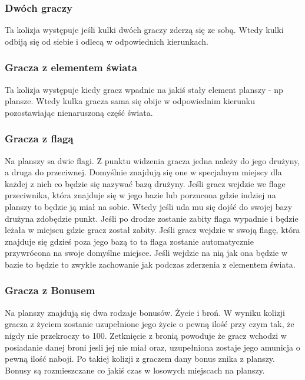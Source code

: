 \documentclass[12pt,a4paper,twoside]{article}
\begin{document}
\subsubsection{Dwóch graczy}
Ta kolizja występuje jeśli kulki dwóch graczy zderzą się ze sobą. Wtedy kulki odbiją się od siebie i odlecą w odpowiednich kierunkach.

\subsubsection{Gracza z elementem świata}
Ta kolizja występuje kiedy gracz wpadnie na jakiś stały element planszy - np plansze. Wtedy kulka gracza sama się obije w odpowiednim kierunku pozostawiając nienaruszoną część świata.

\subsubsection{Gracza z flagą}
Na planszy sa dwie flagi. Z punktu widzenia gracza jedna należy do jego drużyny, a druga do przeciwnej. Domyślnie znajdują się one w specjalnym miejscy dla każdej z nich co będzie się nazywać bazą drużyny. Jeśli gracz wejdzie we flage przeciwnika, która znajduje się w jego bazie lub porzucona gdzie indziej na planszy to będzie ją miał na sobie. Wtedy jeśli uda mu się dojść do swojej bazy drużyna zdobędzie punkt. Jeśli po drodze zostanie zabity flaga wypadnie i będzie leżała w miejscu gdzie gracz został zabity. Jeśli gracz wejdzie w swoją flagę, która znajduje się gdzieś poza jego bazą to ta flaga zostanie automatycznie przywrócona na swoje domyślne miejsce. Jeśli wejdzie na nią jak ona będzie w bazie to będzie to zwykłe zachowanie jak podczas zderzenia z elementem świata.

\subsubsection{Gracza z Bonusem}
Na planszy znajdują się dwa rodzaje bonusów. Życie i broń. W wyniku kolizji gracza z życiem zostanie uzupełnione jego życie o pewną ilość przy czym tak, że nigdy nie przekroczy to 100. Zetknięcie z bronią powoduje że gracz wchodzi w posiadanie danej broni jesli jej nie miał oraz, uzupełniona zostaje jego amunicja o pewną ilość naboji. Po takiej kolizji z graczem dany bonus znika z planszy. Bonusy są rozmieszczane co jakiś czas w losowych miejscach na planszy. 
\end{document}
